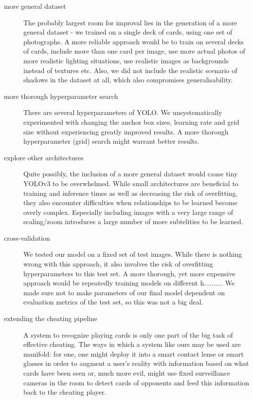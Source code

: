 \documentclass[a4paper]{article}
\begin{document}
\begin{description}
\item[more general dataset] The probably largest room for improval lies in the generation of a more general dataset - we trained on a single deck of cards, using one set of photographs. A more reliable approach would be to train on several decks of cards, include more than one card per image, use more actual photos of more realistic lighting situations, use realistic images as backgrounds instead of textures etc.
Also, we did not include the realistic scenario of shadows in the dataset at all, which also compromises generalisability.
\item[more thorough hyperparameter search] There are several hyperparameters of YOLO. We unsystematically experimented with changing the anchor box sizes, learning rate and grid size without experiencing greatly improved results. A more thorough hyperparameter (grid) search might warrant better results.

\item[explore other architectures] Quite possibly, the inclusion of a more general dataset would cause tiny YOLOv3 to be overwhelmed. While small architectures are beneficial to training and inference times as well as decreasing the risk of overfitting, they also encounter difficulties when relationships to be learned become overly complex. Especially including images with a very large range of scaling/zoom introduces a large number of more subtelities to be learned.
\item[cross-validation] We tested our model on a fixed set of test images. While there is nothing wrong with this approach, it also involves the risk of overfitting hyperparameters to this test set. A more thorough, yet more expensive approach would be repeatedly training models on different h.......... We made sure not to make parameters of our final model dependent on evaluation metrics of the test set, so this was not a big deal.
\item[extending the cheating pipeline] A system to recognize playing cards is only one part of the big task of effective cheating. The ways in which a system like ours may be used are manifold: for one, one might deploy it into a smart contact lense or smart glasses in order to augment a user's reality with information based on what cards have been seen or, much more evil, might use fixed surveillance cameras in the room to detect cards of opponents and feed this information back to the cheating player. 
\end{description}
\end{document}
